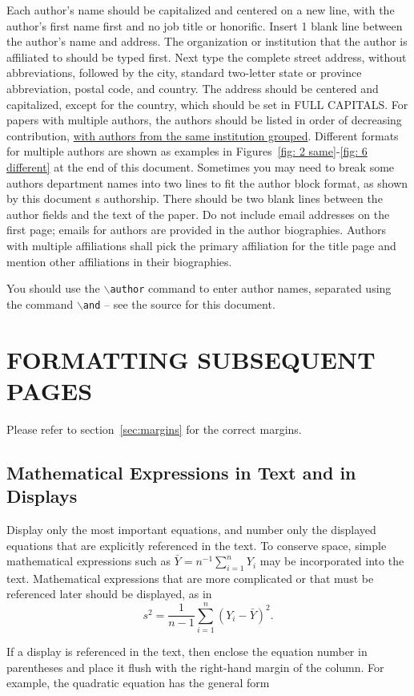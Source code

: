 \documentclass{article}
\begin{document}
Each author's name should be capitalized and centered on a new line, with the author's first name first and no job title or honorific.
Insert 1 blank line between the author's name and address. 
The organization or institution that the author is affiliated to should be typed first.
Next type the complete street address, without abbreviations, followed by the city, standard two-letter state or province abbreviation, postal code, and country.
The address should be centered and capitalized, except for the country, which should be set in FULL CAPITALS.
For papers with multiple authors, the authors should be listed in order of decreasing contribution, \underline{with authors from the same institution grouped}.
Different formats for multiple authors are shown as examples in Figures~\ref{fig: 2 same}-\ref{fig: 6 different} at the end of this document.
Sometimes you may need to break some authors  department names into two lines to fit the author block format, as shown by this document s authorship.
There should be two blank lines between the author fields and the text of the paper. 
Do not include email addresses on the first page; emails for authors are provided in the author biographies. Authors with multiple affiliations shall pick the primary affiliation for the title page and mention other affiliations in their biographies.

You should use the {\tt $\backslash$author} command to enter author names, separated using the command {\tt $\backslash$and} -- see the source for this document.

\section{FORMATTING SUBSEQUENT PAGES}
Please refer to section~\ref{sec:margins} for the correct margins.

\subsection{Mathematical Expressions in Text and in Displays}
Display only the most important equations, and number only the displayed equations that are explicitly referenced in the text.
To conserve space, simple mathematical expressions such as $\bar Y = n^{-1} \sum_{i=1}^n Y_i$ may be incorporated into the text.
Mathematical expressions that are more complicated or that must be referenced later should be displayed, as in
$$s^2 = \frac 1 {n-1} \sum_{i=1}^n (Y_i - \bar Y)^2.$$

If a display is referenced in the text, then enclose the equation number in parentheses and place it flush with the right-hand margin of the
column. For example, the quadratic equation has the general form
\end{document}
